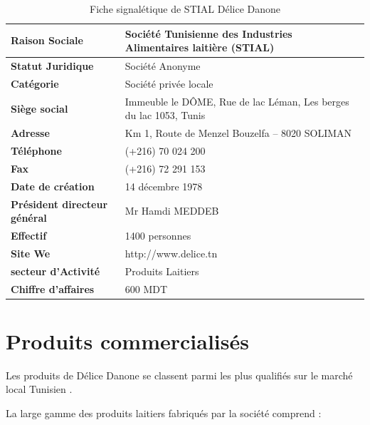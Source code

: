 \begin{spacing}{1.2}
\begin{table}[!h]
	\centering
	\caption{Fiche signalétique de STIAL Délice Danone}
	\footnotesize
	\begin{tabularx}
	{\linewidth}{
  |>{\centering{}\vspace*{\fill}}X
  |>{\vspace*{\fill}}X
  <{\centering{}}|}
			\hline
\textbf{Raison Sociale}			&	Société Tunisienne des Industries Alimentaires laitière (STIAL) \\
			\hline
\textbf{Statut Juridique}			&	Société Anonyme \\
  			\hline
\textbf{Catégorie}			&	Société privée locale \\
			\hline
\textbf{Siège social}			&	Immeuble le DÔME, Rue de lac Léman, Les berges du lac 1053, Tunis \\
			\hline
\textbf{Adresse}			&	Km 1, Route de Menzel Bouzelfa – 8020 SOLIMAN \\
			\hline
\textbf{Téléphone}			&	(+216) 70 024 200 \\
			\hline
\textbf{Fax}			&	(+216) 72 291 153 \\
			\hline
\textbf{Date de création}			&	14 décembre 1978 \\
			\hline
      \textbf{Président directeur général}			&	Mr Hamdi MEDDEB \\
      			\hline
            \textbf{Effectif}			&	1400 personnes \\
            			\hline
                  \textbf{Site We}			&	 http://www.delice.tn \\
                  			\hline
                        \textbf{secteur d’Activité}			&	Produits Laitiers \\
                        			\hline
                              \textbf{Chiffre d’affaires}			&	600 MDT \\
                              			\hline
	\end{tabularx}
	\label{tab:usecasediagram}
\end{table}


\section{Produits commercialisés}
Les produits de Délice Danone se classent parmi les plus qualifiés sur le marché local Tunisien .\newline

La large gamme des produits laitiers fabriqués par la société comprend :



\end{spacing}
